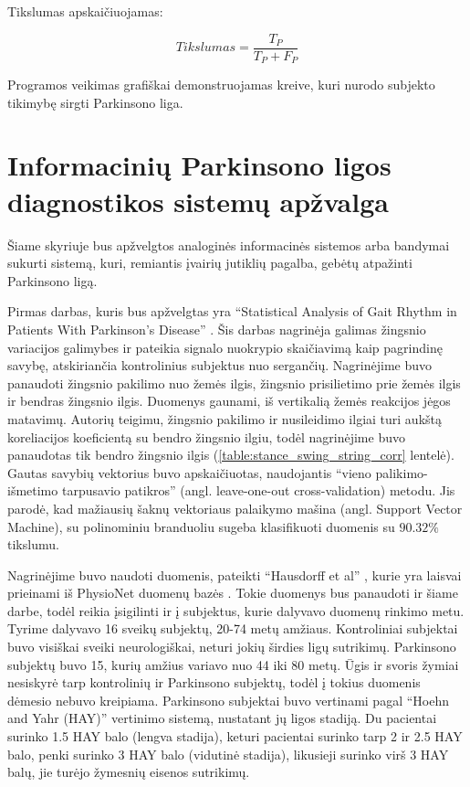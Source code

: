\documentclass[]{vgtuef}
\begin{document}
Tikslumas apskaičiuojamas:

\begin{equation}
Tikslumas = \frac{T_P}{T_P + F_P}
\end{equation}

Programos veikimas grafiškai demonstruojamas kreive, kuri nurodo subjekto tikimybę sirgti Parkinsono liga.

\section{Informacinių Parkinsono ligos diagnostikos sistemų apžvalga}

Šiame skyriuje bus apžvelgtos analoginės informacinės sistemos arba bandymai sukurti sistemą, kuri, remiantis įvairių jutiklių pagalba, gebėtų atpažinti Parkinsono ligą.

Pirmas darbas, kuris bus apžvelgtas yra ``Statistical Analysis of Gait Rhythm in Patients With Parkinson's Disease'' \cite{5280353}. Šis darbas nagrinėja galimas žingsnio variacijos galimybes ir pateikia signalo nuokrypio skaičiavimą kaip pagrindinę savybę, atskiriančia kontrolinius subjektus nuo sergančių. Nagrinėjime buvo panaudoti žingsnio pakilimo nuo žemės ilgis, žingsnio prisilietimo prie žemės ilgis ir bendras žingsnio ilgis. Duomenys gaunami, iš vertikalią žemės reakcijos jėgos matavimų. Autorių teigimu, žingsnio pakilimo ir nusileidimo ilgiai turi aukštą koreliacijos koeficientą su bendro žingsnio ilgiu, todėl nagrinėjime buvo panaudotas tik bendro žingsnio ilgis (\ref{table:stance_swing_string_corr} lentelė). Gautas savybių vektorius buvo apskaičiuotas, naudojantis ``vieno palikimo-išmetimo tarpusavio patikros'' (angl. leave-one-out cross-validation) metodu. Jis parodė, kad mažiausių šaknų vektoriaus palaikymo mašina (angl. Support Vector Machine), su polinominiu branduoliu sugeba klasifikuoti duomenis su $90.32 \%$ tikslumu. 

Nagrinėjime buvo naudoti duomenis, pateikti ``Hausdorff et al'' \cite{MDS:MDS870130310}, kurie yra  laisvai prieinami iš PhysioNet duomenų bazės \cite{932728}. Tokie duomenys bus panaudoti ir šiame darbe, todėl reikia įsigilinti ir į subjektus, kurie dalyvavo duomenų rinkimo metu. Tyrime dalyvavo 16 sveikų subjektų, 20-74 metų amžiaus. Kontroliniai subjektai buvo visiškai sveiki neurologiškai, neturi jokių širdies ligų sutrikimų. Parkinsono subjektų buvo 15, kurių amžius variavo nuo 44 iki 80 metų. Ūgis ir svoris žymiai nesiskyrė tarp kontrolinių ir Parkinsono subjektų, todėl į tokius duomenis dėmesio nebuvo kreipiama. Parkinsono subjektai buvo vertinami pagal ``Hoehn and Yahr (HAY)'' vertinimo sistemą, nustatant jų ligos stadiją. Du pacientai surinko 1.5 HAY balo (lengva stadija), keturi pacientai surinko tarp 2 ir 2.5 HAY balo, penki surinko 3 HAY balo (vidutinė stadija), likusieji surinko virš 3 HAY balų, jie turėjo žymesnių eisenos sutrikimų. 
\end{document}
